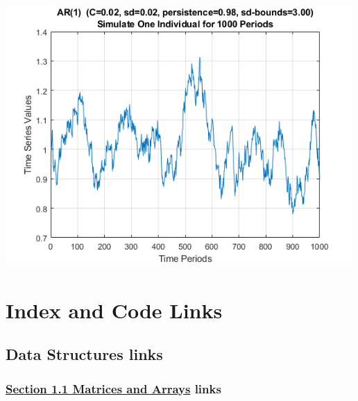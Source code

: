 \documentclass[
]{book}
\begin{document}
\includegraphics[width=5.20833in,height=\textheight]{img/fs_autoregressive_images/figure_0.png}

\hypertarget{appendix-appendix}{%
\appendix}


\hypertarget{index-and-code-links}{%
\chapter{Index and Code Links}\label{index-and-code-links}}

\hypertarget{data-structures-links}{%
\section{Data Structures links}\label{data-structures-links}}

\hypertarget{section-1.1-matrices-and-arraysmatrices-and-arrays-links}{%
\subsection{\texorpdfstring{\protect\hyperlink{matrices-and-arrays}{Section 1.1 Matrices and Arrays} links}{Section 1.1 Matrices and Arrays links}}\label{section-1.1-matrices-and-arraysmatrices-and-arrays-links}}
\end{document}
